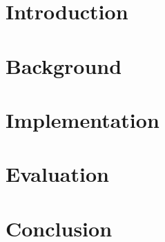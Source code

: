
\chapter{Introduction}
\label{ch:introduction}
\setcounter{page}{1} 


\chapter{Background}
\label{ch:background}


\chapter{Implementation}
\label{ch:implementation}


\chapter{Evaluation}
\label{ch:evaluation}


\chapter{Conclusion}
\label{ch:conclusion}

